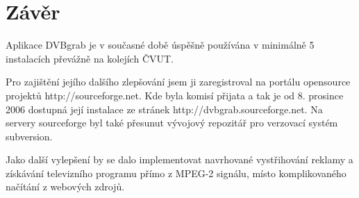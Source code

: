 \chapter{Závěr}
Aplikace DVBgrab je v současné době úspěšně používána v minimálně 5 instalacích převážně na kolejích ČVUT. 

Pro zajištění jejího dalšího zlepšování jsem ji zaregistroval na portálu opensource projektů http://sourceforge.net. Kde byla komisí přijata a tak je od 8. prosince 2006 dostupná její instalace ze stránek http://dvbgrab.sourceforge.net. Na servery sourceforge byl také přesunut vývojový repozitář pro verzovací systém subversion.

Jako další vylepšení by se dalo implementovat navrhované vystřihování reklamy a získávání televizního programu přímo z MPEG-2 signálu, místo komplikovaného načítání z webových zdrojů.
